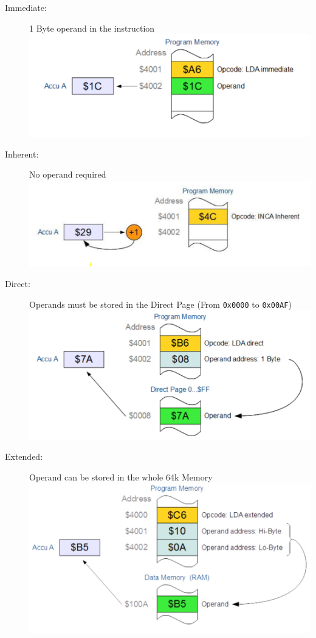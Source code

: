 \documentclass[a4paper, 11pt, nofootinbib]{article}
\newcommand{\code}[1]{\texttt{#1}}
\begin{document}
\begin{description}
	\item[Immediate: ] 1 Byte operand in the instruction \\
		\includegraphics[keepaspectratio=true, height=10\baselineskip]{immAdd.PNG}
	\item[Inherent: ] No operand required \\
		\includegraphics[keepaspectratio=true, height=10\baselineskip]{inhAdd.PNG}
	\item[Direct: ] Operands must be stored in the Direct Page (From \code{0x0000} to \code{0x00AF}) \\
		\includegraphics[keepaspectratio=true, height=10\baselineskip]{dirAdd.PNG}
	\item[Extended: ] Operand can be stored in the whole 64k Memory \\	
		\includegraphics[keepaspectratio=true, height=10\baselineskip]{extAdd.PNG}

\end{description}
\end{document}
